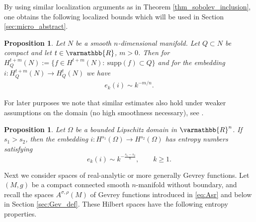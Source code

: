 \documentclass[12pt,twoside]{amsart}
\numberwithin{equation}{section}
\renewcommand{\geq}{\geqslant}
\renewcommand{\mathbb}{\varmathbb}
\newtheorem{proposition}[theorem]{Proposition}
\newcommand {\R} {\mathbb{R}} \newcommand {\Z} {\mathbb{Z}}
\newcommand{\mR}{\mathbb{R}}                    %
\newcommand{\supp}{\mathrm{supp}}
\begin{document}
By using similar localization arguments as in Theorem \ref{thm_sobolev_inclusion}, one obtains the following localized bounds which will be used in Section \ref{sec:micro_abstract}.

\begin{proposition}
\label{prop:entropy_localized}
Let $N$ be a smooth $n$-dimensional manifold. Let $Q\subset N$ be compact and let $t\in \R$, $m>0$. Then for $H^{t+m}_Q(N) :=\{f\in H^{t+m}(N): \ \supp(f)\subset Q\}$ 
and for the embedding $i: H^{t+m}_Q(N) \to H^t_Q(N)$ we have 
\begin{align*}
e_k(i) \sim k^{-m/n}.
\end{align*}
\end{proposition}

For later purposes we note that similar estimates also hold under weaker assumptions on the domain (no high smoothness necessary), see \cite[Theorem 23.2]{Triebel_fractals}.

\begin{proposition} \label{prop_ek_nonsmooth}
Let $\Omega$ be a bounded Lipschitz domain in $\mR^n$. If $s_1 > s_2$, then the embedding $i: H^{s_1}(\Omega) \to H^{s_2}(\Omega)$ has entropy numbers satisfying 
\[
e_k(i) \sim k^{-\frac{s_1-s_2}{n}}, \qquad k \geq 1.
\]
\end{proposition}


Next we consider spaces of real-analytic or more generally Gevrey functions. Let $(M,g)$ be a compact connected smooth $n$-manifold without boundary, and recall the spaces $A^{\sigma,\rho}(M)$ of Gevrey functions introduced in \eqref{eq:Asr} and below in Section \ref{sec:Gev_def}. These Hilbert spaces have the following entropy properties.
\end{document}
